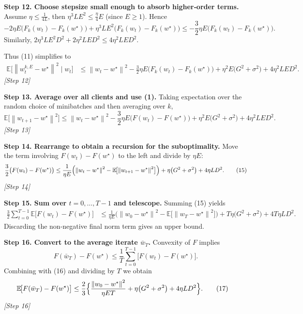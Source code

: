 \documentclass{article}
\newcommand{\EE}{\mathbb{E}}
\newcommand{\norm}[1]{\left\lVert#1\right\rVert}
\begin{document}
\bigskip
\noindent\textbf{Step 12. Choose stepsize small enough to absorb higher‑order terms.}  
Assume $\eta\le \frac{1}{4L}$, then $\eta^3 L E^2\le \frac{\eta}{4}E$ (since $E\ge1$). Hence
\[
-2\eta E\bigl(F_k(w_t)-F_k(w^\star)\bigr)
+ \eta^3 L E^2\bigl(F_k(w_t)-F_k(w^\star)\bigr)
\le -\frac{3}{2}\eta E\bigl(F_k(w_t)-F_k(w^\star)\bigr). \tag{12}
\]
Similarly, $2\eta^3 L E^2 D^2 + 2\eta^2 L E D^2 \le 4\eta^2 L E D^2$.

Thus (11) simplifies to
\begin{align}
\EE\!\bigl[\norm{w_{t}^{k,E}-w^\star}^2\mid w_t\bigr]
&\le \norm{w_t-w^\star}^2
 -\frac{3}{2}\eta E\bigl(F_k(w_t)-F_k(w^\star)\bigr)
 +\eta^2E\bigl(G^2+\sigma^2\bigr)
 +4\eta^2 L E D^2 . \tag{13}
\end{align}
\textit{[Step 12]}

\bigskip
\noindent\textbf{Step 13. Average over all clients and use (1).}  
Taking expectation over the random choice of minibatches and then averaging over $k$,
\[
\EE\!\bigl[\norm{w_{t+1}-w^\star}^2\bigr]
\le \norm{w_t-w^\star}^2
 -\frac{3}{2}\eta E\bigl(F(w_t)-F(w^\star)\bigr)
 +\eta^2E\bigl(G^2+\sigma^2\bigr)
 +4\eta^2 L E D^2 . \tag{14}
\]
\textit{[Step 13]}

\bigskip
\noindent\textbf{Step 14. Rearrange to obtain a recursion for the suboptimality.}  
Move the term involving $F(w_t)-F(w^\star)$ to the left and divide by $\eta E$:
\[
\frac{3}{2}\bigl(F(w_t)-F(w^\star)\bigr)
\le \frac{1}{\eta E}\Bigl(\norm{w_t-w^\star}^2-\EE\!\bigl[\norm{w_{t+1}-w^\star}^2\bigr]\Bigr)
      +\eta\bigl(G^2+\sigma^2\bigr)+4\eta L D^2 . \tag{15}
\]
\textit{[Step 14]}

\bigskip
\noindent\textbf{Step 15. Sum over $t=0,\dots,T-1$ and telescope.}  
Summing (15) yields
\begin{align}
\frac{3}{2}\sum_{t=0}^{T-1}\EE\!\bigl[F(w_t)-F(w^\star)\bigr]
&\le \frac{1}{\eta E}\bigl(\norm{w_0-w^\star}^2-\EE\!\bigl[\norm{w_T-w^\star}^2\bigr]\bigr)
   + T\eta\bigl(G^2+\sigma^2\bigr)+4T\eta L D^2 . \tag{16}
\end{align}
Discarding the non‑negative final norm term gives an upper bound.

\bigskip
\noindent\textbf{Step 16. Convert to the average iterate $\bar w_T$.}  
Convexity of $F$ implies
\[
F(\bar w_T)-F(w^\star)\le \frac1T\sum_{t=0}^{T-1}\bigl[F(w_t)-F(w^\star)\bigr].
\]
Combining with (16) and dividing by $T$ we obtain
\begin{align}
\EE\!\bigl[F(\bar w_T)-F(w^\star)\bigr]
&\le \frac{2}{3}\Bigl\{\frac{\norm{w_0-w^\star}^2}{\eta E T}
      +\eta\bigl(G^2+\sigma^2\bigr)+4\eta L D^2\Bigr\}. \tag{17}
\end{align}
\textit{[Step 16]}
\end{document}
